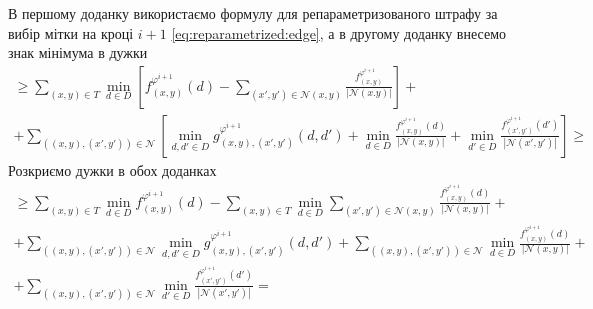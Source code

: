 В першому доданку використаємо формулу для репараметризованого штрафу за вибір
мітки на кроці $i + 1$ \eqref{eq:reparametrized:edge},
а в другому доданку внесемо знак мінімума в дужки
\begin{equation*}
\begin{gathered}
    \ge \sum \limits_{\left(x, y \right) \in T}
        \min \limits_{d \in D} \left[
            f_{\left(x, y \right)}^{\varphi^{i + 1}} \left( d \right) -
            \sum \limits_{\left(x', y' \right) \in \mathcal{N}\left(x, y \right)}
                \frac{f_{\left(x, y \right)}^{\varphi^{i + 1}}}{\left| \mathcal{N}\left(x. y \right) \right|}
        \right] + \\
    + \sum \limits_{\left(\left(x, y \right), \left(x', y' \right)\right)\in \mathcal{N}}
    \left[
        \min\limits_{d, d' \in D}
            g_{\left(x, y \right),\left(x', y'\right)}^{\varphi^{i + 1}}
                \left(d, d' \right) +
        \min \limits_{d \in D}
            \frac{f_{\left(x, y \right)}^{\varphi^{i + 1}} \left( d \right)}{\left| \mathcal{N}\left(x, y\right)\right|} +
        \min \limits_{d' \in D}
            \frac{f_{\left(x', y' \right)}^{\varphi^{i + 1}} \left( d' \right)}{\left| \mathcal{N}\left(x', y'\right)\right|}
    \right] \ge
\end{gathered}
\end{equation*}
Розкриємо дужки в обох доданках
\begin{equation*}
\begin{gathered}
    \ge \sum \limits_{\left(x, y \right) \in T}
        \min \limits_{d \in D}
            f_{\left(x, y \right)}^{\varphi^{i + 1}}\left( d \right) -
    \sum \limits_{\left(x, y \right) \in T}
        \min \limits_{d \in D}
            \sum \limits_{\left(x', y' \right) \in \mathcal{N} \left(x, y \right)}
                \frac{f_{\left(x, y \right)}^{\varphi^{i + 1}} \left( d \right)}{\left| \mathcal{N}\left(x, y \right) \right|} + \\
    + \sum \limits_{\left(\left(x, y \right), \left(x', y' \right) \right)\in\mathcal{N}}
        \min \limits_{d, d' \in D}
            g_{\left(x, y \right), \left(x', y' \right)}^{\varphi^{i + 1}}
                \left(d, d' \right) +
    \sum \limits_{\left(\left(x, y \right), \left(x', y' \right) \right)\in\mathcal{N}}
        \min \limits_{d \in D}
            \frac{f_{\left(x, y \right)}^{\varphi^{i + 1}} \left( d \right)}{\left| \mathcal{N}\left(x, y\right)\right|} + \\
    + \sum \limits_{\left(\left(x, y \right), \left(x', y' \right) \right)\in\mathcal{N}}
    \min \limits_{d' \in D}
        \frac{f_{\left(x', y' \right)}^{\varphi^{i + 1}} \left( d' \right)}{\left| \mathcal{N}\left(x', y'\right)\right|} =
\end{gathered}
\end{equation*}
